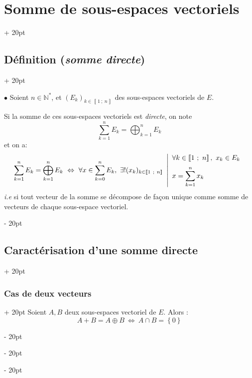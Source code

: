 \documentclass[a4paper, 12pt, twoside]{article}
\newcommand{\N}{\mathbb{N}} %
\newcommand{\nset}[2]{\left\llbracket #1\ ;\ #2 \right\rrbracket}
\newcommand{\set}[1]{\left\{ #1 \right\}}
\newcommand{\ssi}{\ \Leftrightarrow \ }
\newcommand{\ind}[1][20pt]{\advance\leftskip + #1}
\newcommand{\deind}[1][20pt]{\advance\leftskip - #1}
\newenvironment{indt}[2][20pt]{#2 \par \ind[#1]}{\par \deind} %
\begin{document}
\begin{indt}{\section{Somme de sous-espaces vectoriels}}
\begin{indt}{\subsection{Définition (\textit{somme directe})}}
            
            $\bullet$ Soient $n \in \N^*$, et $(E_k)_{k \in \nset 1 n}$ des sous-espaces vectoriels de $E$.
            
            Si la somme de ces sous-espaces vectoriels est \textit{directe}, on note
                \[ \sum_{k = 1}^n E_k = \bigoplus_{k = 1}^n E_k \]
            et on a:
                \[
                    \sum_{k = 1}^n E_k = \bigoplus_{k = 1}^n E_k
                    \ssi
                    \forall x \in \sum_{k = 0}^n E_k,\
                    \exists! (x_k)_{k \in \nset 1 n}\
                    \left|
                    \begin{array}{l}
                        \forall k \in \nset 1 n,\ x_k \in E_k
                        \vspace{6pt}
                        \\
                        \displaystyle x = \sum_{k = 1}^n x_k
                    \end{array}
                    \right.
                \]
            \textit{i.e} si tout vecteur de la somme se décompose de façon unique comme somme de vecteurs de chaque sous-espace vectoriel.
        \end{indt}
        
        \vspace{12pt}
        
        \begin{indt}{\subsection{Caractérisation d'une somme directe}}
            \begin{indt}{\subsubsection{Cas de deux vecteurs}}
                Soient $A, B$ deux sous-espaces vectoriel de $E$. Alors :
                    \[ A + B = A \oplus B \ssi A \cap B = \set 0 \]
            \end{indt}
            
            \vspace{12pt}
            

\end{indt}
\end{indt}
\end{document}
